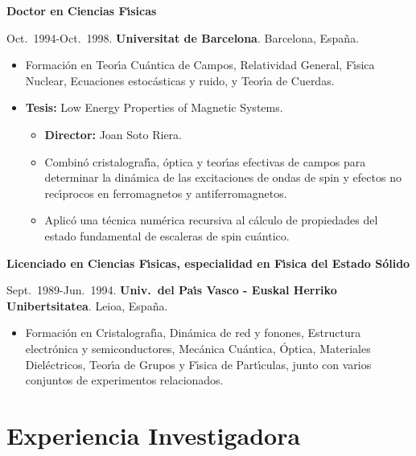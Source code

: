 \documentclass{article}
\begin{document}


\medskip
{\bf Doctor en Ciencias F\'{\i}sicas}

\medskip
Oct.~1994-Oct.~1998. {\bf Universitat de Barcelona}. Barcelona, Espa\~na.

\begin{itemize}\itemsep 0pt
\item Formaci\'on en Teor\'{\i}a Cu\'{a}ntica de Campos, Relatividad General, F\'{\i}sica Nuclear, Ecuaciones estoc\'{a}sticas y ruido, y Teor\'{\i}a de Cuerdas.
\item {\bf Tesis:} Low Energy Properties of Magnetic Systems.
\begin{itemize}
\item {\bf Director:} Joan Soto Riera. 
\item Combin\'{o} cristalograf\'{\i}a, \'{o}ptica y teor\'{\i}as efectivas 
de campos para determinar la din\'{a}mica de las excitaciones de ondas de 
spin y efectos no rec\'{\i}procos en ferromagnetos y antiferromagnetos.
\item Aplic\'{o} una t\'{e}cnica num\'{e}rica recursiva al c\'{a}lculo 
de propiedades del estado fundamental de escaleras de spin cu\'{a}ntico.
\end{itemize}
\end{itemize}

\medskip
{\bf Licenciado en Ciencias F\'{\i}sicas, especialidad en F\'{\i}sica del Estado S\'{o}lido}

\medskip
Sept.~1989-Jun.~1994. 
{\bf Univ.\ del Pa\'{\i}s Vasco - Euskal Herriko Unibertsitatea}. Leioa, Espa\~na.

\begin{itemize}\itemsep 0pt
\item Formaci\'on en Cristalograf\'{\i}a, Din\'{a}mica de red y fonones, 
Estructura electr\'{o}nica y semiconductores, Mec\'{a}nica Cu\'{a}ntica, \'Optica, Materiales Diel\'{e}ctricos, Teor\'{\i}a de Grupos y F\'{\i}sica de Part\'{\i}culas, junto con varios conjuntos de experimentos relacionados.
\end{itemize}


\section*{Experiencia Investigadora}
\end{document}
